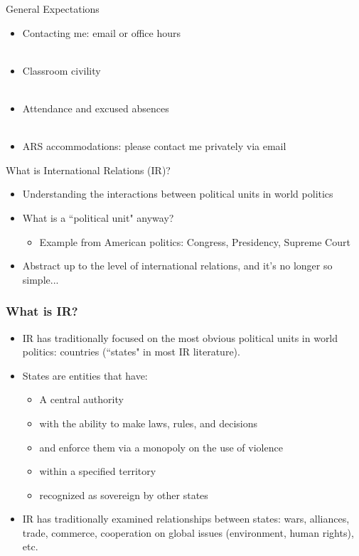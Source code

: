 \documentclass{beamer}
\begin{document}
\begin{frame}{\LARGE General Expectations}
	\begin{itemize}
		\item Contacting me: email or office hours
		\\~\\
		\item Classroom civility
		\\~\\
		\item Attendance and excused absences
		\\~\\
		\item ARS accommodations: please contact me privately via email
	\end{itemize}
\end{frame}

\begin{frame}{\LARGE What is International Relations (IR)?}
    \begin{itemize}
        \item Understanding the interactions between political units in world politics 
        \item What is a ``political unit" anyway? \pause
        \begin{itemize}
        \item Example from American politics: Congress, Presidency, Supreme Court
   		\end{itemize}
        \item Abstract up to the level of international relations, and it's no longer so simple...
    \end{itemize}
\end{frame}

\begin{frame}
\frametitle{\LARGE{What is IR?}}
\begin{itemize}
	\item IR has traditionally focused on the most obvious political units in world politics: countries (``states" in most IR literature).
	\item States are entities that have:
	\begin{itemize}
		\item A central authority \pause
		\item with the ability to make laws, rules, and decisions \pause
		\item and enforce them via a monopoly on the use of violence \pause
		\item within a specified territory \pause
		\item recognized as sovereign by other states \pause
	\end{itemize}
	\item IR has traditionally examined relationships between states: wars, alliances, trade, commerce, cooperation on global issues (environment, human rights), etc.
\end{itemize}
\end{frame}
\end{document}
